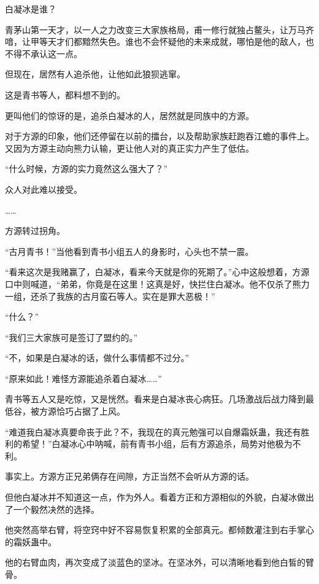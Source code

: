 
\begin{this_body}

白凝冰是谁？

青茅山第一天才，以一人之力改变三大家族格局，甫一修行就独占鳌头，让万马齐喑，让甲等天才们都黯然失色。谁也不会怀疑他的未来成就，哪怕是他的敌人，也不得不承认这一点。

但现在，居然有人追杀他，让他如此狼狈逃窜。

这是青书等人，都料想不到的。

更叫他们的惊讶的是，追杀白凝冰的人，居然就是同族中的方源。

对于方源的印象，他们还停留在以前的擂台，以及帮助家族赶跑吞江蟾的事件上。又因为方源主动向熊力认输，更让他人对的真正实力产生了低估。

“什么时候，方源的实力竟然这么强大了？”

众人对此难以接受。

……

方源转过拐角。

“古月青书！”当他看到青书小组五人的身影时，心头也不禁一震。

“看来这次是我赌赢了，白凝冰，看来今天就是你的死期了。”心中这般想着，方源口中则喊道，“弟弟，你竟是在这里！这真是好，快拦住白凝冰。他不仅杀了熊力一组，还杀了我族的古月蛮石等人。实在是罪大恶极！”

“什么？”

“我们三大家族可是签订了盟约的。”

“不，如果是白凝冰的话，做什么事情都不过分。”

“原来如此！难怪方源能追杀着白凝冰……”

青书等五人又是吃惊，又是恍然。看来是白凝冰丧心病狂。几场激战后战力降到最低谷，被方源恰巧占据了上风。

“难道我白凝冰真要命丧于此？不，我现在的真元勉强可以自爆霜妖蛊，我还有胜利的希望！”白凝冰心中呐喊，前有青书小组，后有方源追杀，局势对他极为不利。

事实上。方源方正兄弟俩存在间隙，方正当然不会听从方源的话。

但他白凝冰并不知道这一点，作为外人。看着方正和方源相似的外貌，白凝冰做出了一个毅然决然的选择。

他突然高举右臂，将空窍中好不容易恢复积累的全部真元。都倾数灌注到右手掌心的霜妖蛊中。

他的右臂血肉，再次变成了淡蓝色的坚冰。在坚冰外，可以清晰地看到他白皙的臂骨。


\end{this_body}
